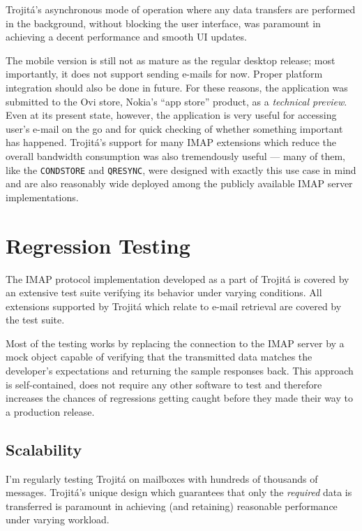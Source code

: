 \documentclass[trojita]{subfiles}
\begin{document}
Trojitá's asynchronous mode of operation where any data transfers are performed in the background, without blocking the
user interface, was paramount in achieving a decent performance and smooth UI updates.

The mobile version is still not as mature as the regular desktop release; most importantly, it does not support sending
e-mails for now.  Proper platform integration should also be done in future.  For these reasons, the application was
submitted to the Ovi store, Nokia's ``app store'' product, as a {\em technical preview}.  Even at its present state,
however, the application is very useful for accessing user's e-mail on the go and for quick checking of whether
something important has happened.  Trojitá's support for many IMAP extensions which reduce the overall bandwidth
consumption was also tremendously useful --- many of them, like the {\tt CONDSTORE} and {\tt QRESYNC}, were designed
with exactly this use case in mind and are also reasonably wide deployed among the publicly available IMAP server
implementations.

\section{Regression Testing}

The IMAP protocol implementation developed as a part of Trojitá is covered by an extensive test suite verifying its
behavior under varying conditions.  All extensions supported by Trojitá which relate to e-mail retrieval are covered by
the test suite.

Most of the testing works by replacing the connection to the IMAP server by a mock object capable of verifying that the
transmitted data matches the developer's expectations and returning the sample responses back.  This approach is
self-contained, does not require any other software to test and therefore increases the chances of regressions getting
caught before they made their way to a production release.

\subsection{Scalability}

I'm regularly testing Trojitá on mailboxes with hundreds of thousands of messages.  Trojitá's unique design which
guarantees that only the {\em required} data is transferred is paramount in achieving (and retaining) reasonable
performance under varying workload.
\end{document}
